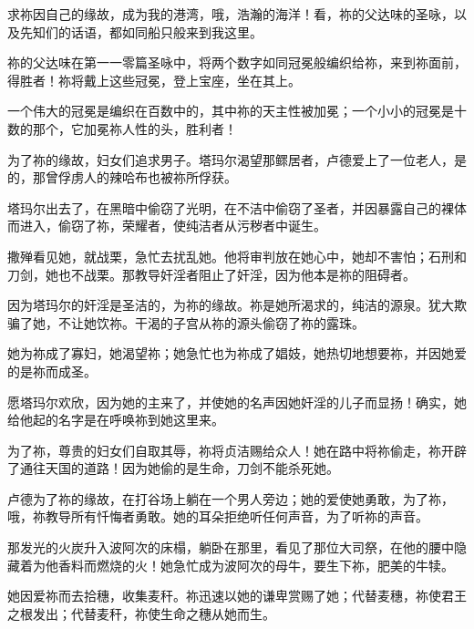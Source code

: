 求祢因自己的缘故，成为我的港湾，哦，浩瀚的海洋！看，祢的父达味的圣咏，以及先知们的话语，都如同船只般来到我这里。\par

祢的父达味在第一一零篇圣咏中，将两个数字如同冠冕般编织给祢，来到祢面前，得胜者！祢将戴上这些冠冕，登上宝座，坐在其上。\par

一个伟大的冠冕是编织在百数中的，其中祢的天主性被加冕；一个小小的冠冕是十数的那个，它加冕祢人性的头，胜利者！\par

为了祢的缘故，妇女们追求男子。塔玛尔渴望那鳏居者，卢德爱上了一位老人，是的，那曾俘虏人的辣哈布也被祢所俘获。\par

塔玛尔出去了，在黑暗中偷窃了光明，在不洁中偷窃了圣者，并因暴露自己的裸体而进入，偷窃了祢，荣耀者，使纯洁者从污秽者中诞生。\par

撒殚看见她，就战栗，急忙去扰乱她。他将审判放在她心中，她却不害怕；石刑和刀剑，她也不战栗。那教导奸淫者阻止了奸淫，因为他本是祢的阻碍者。\par

因为塔玛尔的奸淫是圣洁的，为祢的缘故。祢是她所渴求的，纯洁的源泉。犹大欺骗了她，不让她饮祢。干渴的子宫从祢的源头偷窃了祢的露珠。\par

她为祢成了寡妇，她渴望祢；她急忙也为祢成了娼妓，她热切地想要祢，并因她爱的是祢而成圣。\par

愿塔玛尔欢欣，因为她的主来了，并使她的名声因她奸淫的儿子而显扬！确实，她给他起的名字是在呼唤祢到她这里来。\par

为了祢，尊贵的妇女们自取其辱，祢将贞洁赐给众人！她在路中将祢偷走，祢开辟了通往天国的道路！因为她偷的是生命，刀剑不能杀死她。\par

卢德为了祢的缘故，在打谷场上躺在一个男人旁边；她的爱使她勇敢，为了祢，哦，祢教导所有忏悔者勇敢。她的耳朵拒绝听任何声音，为了听祢的声音。\par

那发光的火炭升入波阿次的床榻，躺卧在那里，看见了那位大司祭，在他的腰中隐藏着为他香料而燃烧的火！她急忙成为波阿次的母牛，要生下祢，肥美的牛犊。\par

她因爱祢而去拾穗，收集麦秆。祢迅速以她的谦卑赏赐了她；代替麦穗，祢使君王之根发出；代替麦秆，祢使生命之穗从她而生。\par


